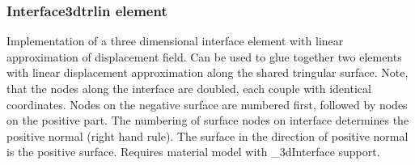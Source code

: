 \documentclass[a4paper]{article}
\begin{document}
\subsubsection{Interface3dtrlin element}
Implementation of a three dimensional interface element with linear
approximation of displacement field. Can be used to glue together two elements with linear displacement approximation along the shared tringular surface. Note, that the nodes along the interface are doubled, each couple with identical coordinates. Nodes on the negative surface are numbered first, followed by nodes on the positive part. The numbering of surface nodes on interface determines the positive normal (right hand rule). The surface in the direction of positive normal is the positive surface. Requires material model with \_3dInterface support.
\end{document}
